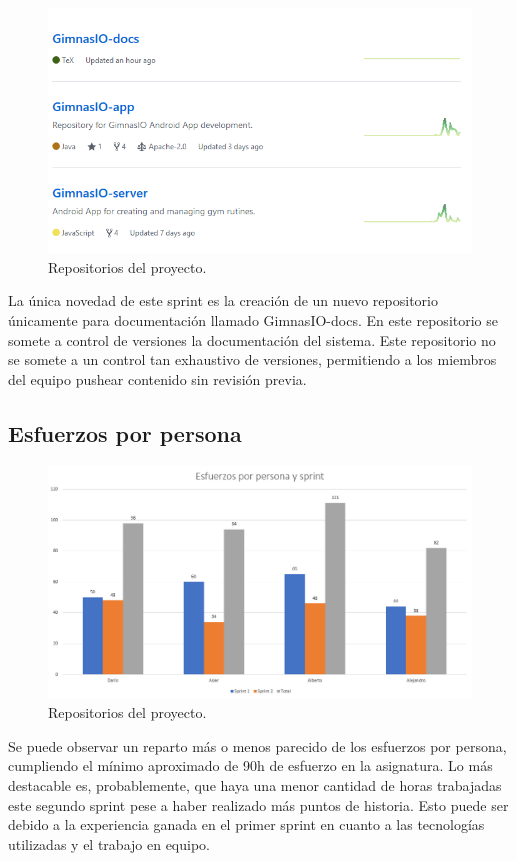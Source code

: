 \documentclass[11pt,a4paper]{report}
\begin{document}
\begin{figure}[H]
	\centering
	\includegraphics[width=1\textwidth]{graficos/repos.png}
	\caption{Repositorios del proyecto.}
	\label{fig: repos}
\end{figure}
La única novedad de este sprint es la creación de un nuevo repositorio únicamente para documentación llamado GimnasIO-docs. En este repositorio se somete a control de versiones la documentación del sistema. Este repositorio no se somete a un control tan exhaustivo de versiones, permitiendo a los miembros del equipo pushear contenido sin revisión previa.

\subsection{Esfuerzos por persona}
\begin{figure}[H]
	\centering
	\includegraphics[width=1\textwidth]{graficos/esfuerzos.png}
	\caption{Repositorios del proyecto.}
	\label{fig: esf}
\end{figure}
Se puede observar un reparto más o menos parecido de los esfuerzos por persona, cumpliendo el mínimo aproximado de 90h de esfuerzo en la asignatura. Lo más destacable es, probablemente, que haya una menor cantidad de horas trabajadas este segundo sprint pese a haber realizado más puntos de historia. Esto puede ser debido a la experiencia ganada en el primer sprint en cuanto a las tecnologías utilizadas y el trabajo en equipo.
\end{document}
